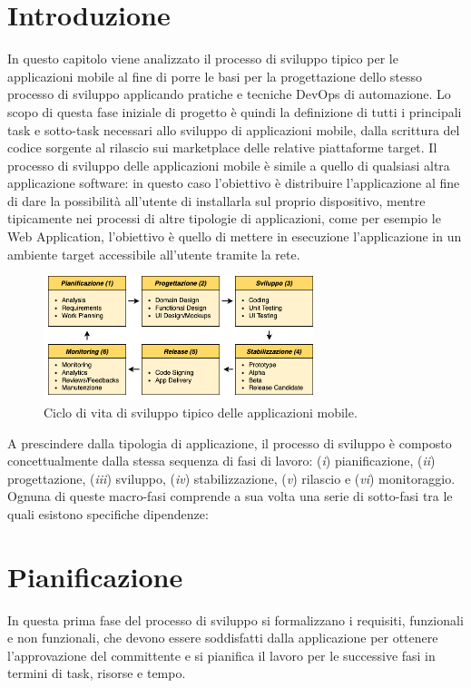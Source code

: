 
\section{Introduzione}
In questo capitolo viene analizzato il processo di sviluppo tipico per le applicazioni mobile al fine di porre le basi per la progettazione dello stesso processo di sviluppo applicando pratiche e tecniche DevOps di automazione. Lo scopo di questa fase iniziale di progetto è quindi la definizione di tutti i principali task e sotto-task necessari allo sviluppo di applicazioni mobile, dalla scrittura del codice sorgente al rilascio sui marketplace delle relative piattaforme target. Il processo di sviluppo delle applicazioni mobile è simile a quello di qualsiasi altra applicazione software: in questo caso l'obiettivo è distribuire l'applicazione al fine di dare la possibilità all'utente di installarla sul proprio dispositivo, mentre tipicamente nei processi di altre tipologie di applicazioni, come per esempio le Web Application, l'obiettivo è quello di mettere in esecuzione l'applicazione in un ambiente target accessibile all'utente tramite la rete.

\begin{figure}[H]
    \centering
    \includegraphics[width=0.7\textwidth]{img/sdlc.png}
    \caption{Ciclo di vita di sviluppo tipico delle applicazioni mobile.}
    \label{sdlc-app-mobile-fig}
\end{figure}

A prescindere dalla tipologia di applicazione, il processo di sviluppo è composto concettualmente dalla stessa sequenza di fasi di lavoro: (\textit{i}) pianificazione, (\textit{ii}) progettazione, (\textit{iii}) sviluppo, (\textit{iv}) stabilizzazione, (\textit{v}) rilascio e (\textit{vi}) monitoraggio. Ognuna di queste macro-fasi comprende a sua volta una serie di sotto-fasi tra le quali esistono specifiche dipendenze:

\section{Pianificazione}
In questa prima fase del processo di sviluppo si formalizzano i requisiti, funzionali e non funzionali, che devono essere soddisfatti dalla applicazione per ottenere l'approvazione del committente e si pianifica il lavoro per le successive fasi in termini di task, risorse e tempo.

